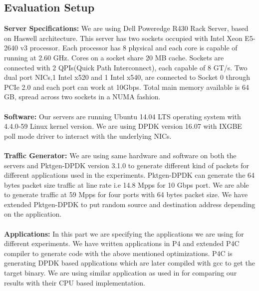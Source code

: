 \subsection{Evaluation Setup}
\textbf{Server Specifications:} We are using Dell Poweredge R430 Rack Server, based on Haswell architecture. This server has two sockets occupied with Intel Xeon E5-2640 
v3\cite{xeon} processor. Each processor has 8 physical and each core is capable of running at 2.60 GHz. Cores on a socket share 20 MB cache. Sockets are connected with 2 QPIs(Quick Path Interconnect), each capable of 8 GT/s. Two dual port NICs,1 Intel x520 and 1 Intel x540, are connected to Socket 0 through PCIe 2.0 and each port can work at 10Gbps. Total main memory available is 64 GB, spread across two sockets in a NUMA fashion.
\\
\\
\textbf{Software:} Our servers are running Ubuntu 14.04 LTS operating system with 4.4.0-59 Linux kernel version. We are using DPDK version 16.07 with IXGBE poll mode driver to
interact with the underlying NICs. 
\\
\\
\textbf{Traffic Generator:} We are using same hardware and software on both the servers and Pktgen-DPDK\cite{pktgen} version 3.1.0 to generate different kind of packets for different applications used in the experiments. Pktgen-DPDK\cite{pktgen} can generate the 64 bytes packet size traffic at line rate i.e 14.8 Mpps for 10 Gbps port. We are able to generate traffic at 59 Mpps for four ports with 64 bytes packet size. We have extended Pktgen-DPDK\cite{pktgen} to put random source and destination address depending on the application.
\\
\\
\textbf{Applications:} In this part we are specifying the applications we are using for different experiments. We have written applications in P4\cite{Bosshart:2014:PPP:2656877.2656890} and extended P4C\cite{Laki:2016:HSP:2934872.2959080} compiler to generate code with the above mentioned optimizations. P4C\cite{Laki:2016:HSP:2934872.2959080} is generating DPDK\cite{DPDK} based applications which are later compiled with gcc to get the target binary. We are using similar application as used in \cite{189006} for comparing our results with their CPU based implementation. 
